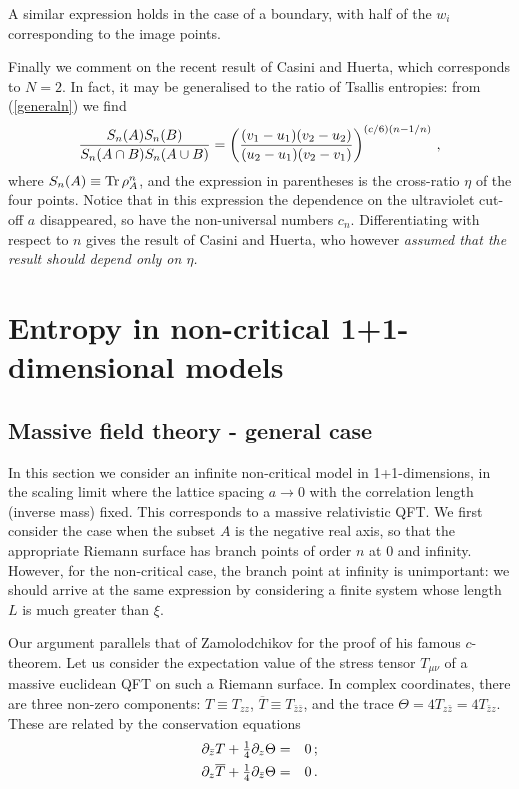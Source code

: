 \documentclass[12pt,aps]{revtex4}
\def\ffrac#1#2{\textstyle{#1\over#2}\displaystyle}
\begin{document}
A similar expression holds in the case of a boundary, with half of the
$w_i$ corresponding to the image points.

Finally we comment on the recent result of Casini and
Huerta\cite{Casini}, which corresponds to $N=2$. In fact, it may be
generalised to the ratio of Tsallis entropies: from (\ref{generaln})
we find
\begin{equation}
{S_n(A)S_n(B)\over S_n(A\cap B)S_n(A\cup B)}=
\left({(v_1-u_1)(v_2-u_2)\over (u_2-u_1)(v_2-v_1)}\right)^{(c/6)(n-1/n)}\,,
\end{equation}
where $S_n(A)\equiv{\rm Tr}\,\rho_A^n$, and
the expression in parentheses is the cross-ratio $\eta$ of the four
points. Notice that in this expression the dependence on
the ultraviolet cut-off $a$ disappeared, so have the non-universal
numbers $c_n$. Differentiating with respect to $n$ gives the result of
Casini and Huerta\cite{Casini}, who however \em assumed \em
that the result should depend only on $\eta$.

\section{Entropy in non-critical 1+1-dimensional models}
\label{sectmass}
\subsection{Massive field theory - general case}
In this section we consider an infinite non-critical
model in 1+1-dimensions, in the scaling limit where the lattice spacing
$a\to0$ with the correlation length (inverse mass) fixed.
This corresponds to a massive relativistic QFT. We first consider the
case when the subset $A$ is the negative real axis, so that the
appropriate Riemann surface has branch points of order $n$ at 0 and
infinity. However, for the non-critical case, the branch point at
infinity is unimportant: we should arrive at the same expression
by considering a finite system whose length $L$ is much greater than
$\xi$.

Our argument parallels that of Zamolodchikov\cite{Zam} for the proof of his
famous $c$-theorem.
Let us consider the expectation value of the stress tensor $T_{\mu\nu}$
of a massive euclidean QFT on such a Riemann surface. In complex
coordinates, there are three non-zero components: $T\equiv T_{zz}$,
$\overline T\equiv T_{\bar z\bar z}$, and the trace
$\Theta=4T_{z\bar z}=4T_{\bar zz}$. These are related by the
conservation equations
\begin{eqnarray}
\label{cons}
\partial_{\bar z}T+\ffrac14\partial_z\Theta&=&0\,;\\
\partial_z\overline T+\ffrac14\partial_{\bar z}\Theta&=&0\,.
\end{eqnarray}
\end{document}
